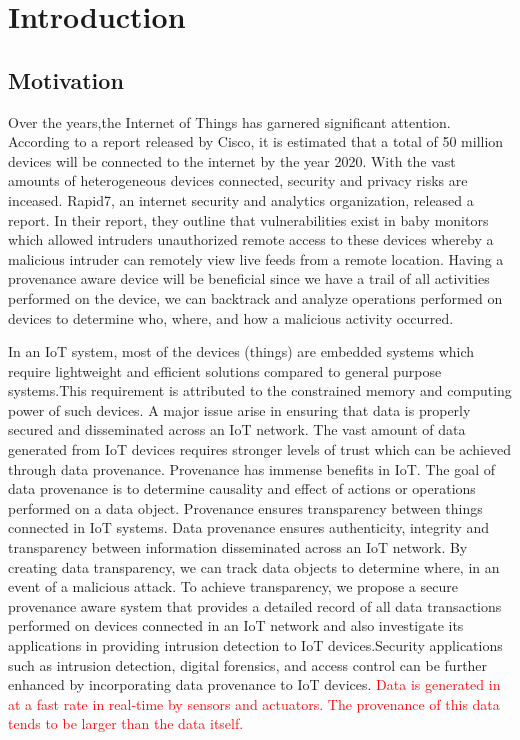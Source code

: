 \chapter{Introduction}\label{chapter:introduction}

\section{Motivation}
Over the years,the Internet of Things has garnered significant attention. According to a report released by Cisco, it is estimated that a total of 50 million devices will be
connected to the internet by the year 2020. With the vast amounts of heterogeneous devices connected,
security and privacy risks are inceased. Rapid7, an  internet security and analytics organization, released a report. In their report, they outline that vulnerabilities exist in
baby monitors which allowed intruders unauthorized remote access to these devices
whereby a malicious intruder can remotely view live feeds from a remote location. Having a provenance aware device will be beneficial since we have a trail of all activities performed on the device, we can backtrack and analyze operations
performed on devices to determine who, where, and how a malicious activity
occurred. 
\par In an IoT system, most of the devices (things) are embedded systems which
require lightweight and efficient solutions compared to general purpose
systems.This requirement is attributed to the constrained memory and computing power of such
devices. A major issue arise in ensuring that data is properly secured and
disseminated across an IoT network. The vast amount of data generated from IoT
devices requires stronger levels of trust which can be achieved through data
provenance. Provenance has immense benefits in IoT. The goal of data provenance is to determine causality and effect of actions or
operations performed on a data object. Provenance ensures transparency between things
connected in IoT systems. Data provenance ensures
authenticity, integrity and transparency between information disseminated across an
IoT network. By creating data transparency, we can track data objects to
determine where, in an event of a malicious attack. To achieve transparency, we
propose a secure provenance aware system that provides a detailed record of all data
transactions performed on devices connected in an IoT network and also investigate its applications in providing intrusion detection to IoT devices.Security applications such as intrusion detection, digital forensics, and
access control can be further enhanced by incorporating data provenance to IoT devices.   \textcolor{red}{Data is generated in at a fast rate in real-time by sensors and actuators. The provenance of this data tends to be larger than the data itself.}


